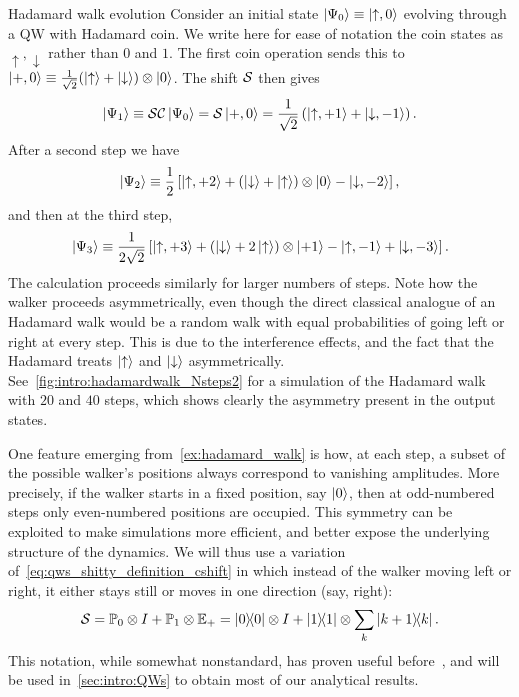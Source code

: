 \begin{examplebox}[label=ex:hadamard_walk]{Hadamard walk evolution}
Consider an initial state $\ket{\Psi_0}\equiv\ket{\uparrow,0}$ evolving through a QW with Hadamard coin. We write here for ease of notation the coin states as $\uparrow,\downarrow$ rather than $0$ and $1$.
The first coin operation sends this to $\ket{+,0}\equiv\frac{1}{\sqrt2}(\ket\uparrow+\ket\downarrow)\otimes\ket0$. The shift ${\mathcal{S}}$ then gives
\begin{equation}
    \ket{\Psi_1} \equiv 
    {\mathcal{S}}{\mathcal{C}}\ket{\Psi_0} =
    {\mathcal{S}}\ket{+,0} =
    \frac{1}{\sqrt2} \left( \ket{\uparrow,+1} + \ket{\downarrow, -1} \right).
\end{equation}
After a second step we have
\begin{equation}
    \ket{\Psi_2} \equiv
    \frac12\left[
        \ket{\uparrow,+2} +
        (\ket{\downarrow}
        + \ket{\uparrow})\otimes \ket{0}
        - \ket{\downarrow, -2}
    \right],
\end{equation}
and then at the third step,
\begin{equation}
    \ket{\Psi_3} \equiv
    \frac{1}{2\sqrt2}\left[
        \ket{\uparrow,+3} +
        (\ket{\downarrow} + 2\ket{\uparrow})\otimes \ket{+1}
        - \ket{\uparrow,-1}
        + \ket{\downarrow,-3}
    \right].
\end{equation}
The calculation proceeds similarly for larger numbers of steps.
Note how the walker proceeds asymmetrically, even though the direct classical analogue of an Hadamard walk would be a random walk with equal probabilities of going left or right at every step.
This is due to the interference effects, and the fact that the Hadamard treats $\ket\uparrow$ and $\ket\downarrow$ asymmetrically.
See~\cref{fig:intro:hadamardwalk_Nsteps2} for a simulation of the Hadamard walk with $20$ and $40$ steps, which shows clearly the asymmetry present in the output states.
\end{examplebox}

One feature emerging from~\cref{ex:hadamard_walk} is how, at each step, a subset of the possible walker's positions always correspond to vanishing amplitudes. More precisely, if the walker starts in a fixed position, say $\ket0$, then at odd-numbered steps only even-numbered positions are occupied.
This symmetry can be exploited to make simulations more efficient, and better expose the underlying structure of the dynamics.
We will thus use a variation of~\cref{eq:qws_shitty_definition_cshift} in which instead of the walker moving left or right, it either stays still or moves in one direction (say, right):
\begin{equation}
    {\mathcal{S}} = {\mathbb{P}}_0\otimes I + {\mathbb{P}}_1\otimes {\mathbb{E}}_+
    =\ketbra0\otimes I +\ketbra1\otimes\sum_k\ketbra{k+1}{k}.
\end{equation}
This notation, while somewhat nonstandard, has proven useful before~\cite{hoyer2009faster,montero2013unidirectional,montero2015quantum}, and will be used in~\cref{sec:intro:QWs} to obtain most of our analytical results.


